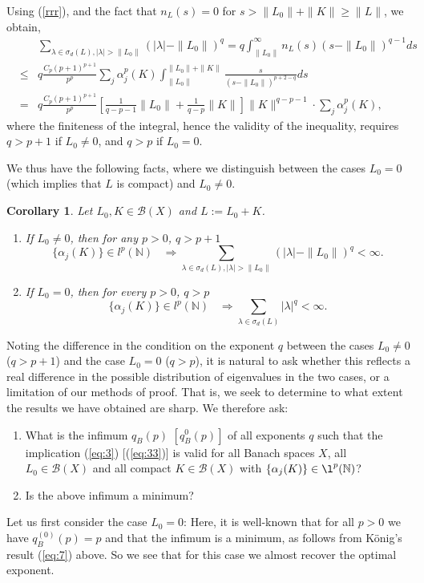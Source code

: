 \documentclass[12pt,a4paper]{article}
\newtheorem {corollary}[theorem]{Corollary}
\theoremstyle{definition}
\theoremstyle{remark}
\numberwithin{equation}{section}
\newcommand{\mn}{{\mathbb N}}
\newcommand{\bdd}{\mathcal{B}}
\begin{document}
Using (\ref{rrr}), and the fact that $n_L(s)=0$ for $s>\|L_0\|+\|K\|\geq \|L\|$, we obtain,  
\begin{eqnarray}&&\label{dh} \sum_{\lambda \in \sigma_d(L), |\lambda|>\|L_0\|}  (|\lambda|-\|L_0\|)^q  = q \int_{\|L_0\|}^\infty n_L(s) (s-\|L_0\|)^{q-1} ds\\
&\leq& q \frac{C_p(p+1)^{p+1}}{p^p} \sum_{j}\alpha_j^p(K)\int_{\|L_0\|}^{\|L_0\|+\|K\|}  \frac{s }{(s-\|L_0\|)^{p+2-q}}   ds\nonumber\\
&=&q \frac{C_p(p+1)^{p+1}}{p^p}\left[\frac{1}{q-p-1}\|L_0\|+ \frac{1}{q-p} \|K\| \right]\|K\|^{q-p-1}\cdot\sum_{j}\alpha_j^p(K),\nonumber
\end{eqnarray}
where the finiteness of the integral, hence the validity of the inequality, requires $q>p+1$ if $L_0\neq 0$, and $q>p$ if $L_0=0$.

We thus have the following facts, where we distinguish between the cases $L_0=0$ (which implies that $L$ is compact) and $L_0\neq 0$. 
\begin{corollary}\label{cor1}
Let $L_0, K \in \bdd(X)$ and $L:=L_0+K$. 
\begin{enumerate} 
    \item[(i)] If $L_0 \neq 0$, then for any $p>0$,  $q>p+1$
\begin{equation}
  \label{eq:3}
 \{\alpha_j(K)\} \in l^p(\mn)\;\;\; \Rightarrow \sum_{\lambda \in \sigma_d(L), |\lambda|>\|L_0\|}  (|\lambda|-\|L_0\|)^{q}<\infty.
\end{equation}
    \item[(ii)] If $L_0 = 0$, then for every $p>0$, $q>p$  
\begin{equation}
  \label{eq:33}
 \{\alpha_j(K)\} \in l^p(\mn) \;\;\;\Rightarrow \sum_{\lambda \in \sigma_d(L)}  |\lambda|^{q} <\infty .
\end{equation}
\end{enumerate}
\end{corollary}

Noting the difference in the condition on the exponent $q$ between the cases $L_0\neq 0$ ($q>p+1$) and the case $L_0=0$ ($q>p$), it is natural 
to ask whether this reflects a real difference in the possible distribution of eigenvalues in the two cases, or a limitation of our 
methods of proof. That is, we seek to determine to what extent the results we have obtained are sharp.  We therefore ask:  
\begin{enumerate} 
    \item What is the infimum $q_{B}(p)$ $[q_{{B}}^0(p)]$ of all exponents $q$ such that the implication (\ref{eq:3}) [(\ref{eq:33})] is valid for all Banach spaces $X$, all $L_0 \in \bdd(X)$ and all compact $K \in \bdd(X)$ with $\{\alpha_j(K)\}\in\l^p(\mn)$?
  \item Is the above infimum a minimum?
\end{enumerate}
Let us first consider the case $L_0=0$: Here, it is well-known that for all $p>0$ we have $q_{{B}}^{(0)}(p)=p$ and that the infimum is a minimum, as follows from K\"onig's result (\ref{eq:7}) above. So we see that for this case we almost recover the optimal exponent. 
 
\end{document}
